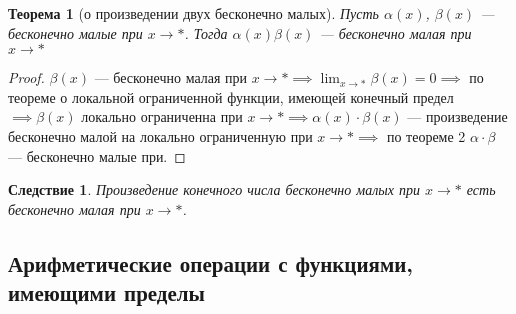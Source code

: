 \documentclass[a4paper,12pt]{article} %
\newtheorem{theorem}{Теорема}[subsection]
\newtheorem{corollary}{Следствие}[theorem]
\theoremstyle{remark}
\begin{document}
\begin{theorem}[о произведении двух бесконечно малых]
	Пусть $\alpha(x)$, $\beta(x)$ --- бесконечно малые при $x \to *$. Тогда $\alpha(x)\beta(x)$ --- бесконечно малая при $x \to *$
\end{theorem}
\begin{proof}
	$\beta(x)$ --- бесконечно малая при $x \to  * \implies \lim_{x \to *} \beta(x) = 0 \implies $ по теореме о локальной ограниченной функции, имеющей конечный предел $\implies \beta(x)$ локально ограниченна при $x\to * \implies \alpha(x)\cdot \beta(x)$ --- произведение бесконечно малой на локально ограниченную при $x\to * \implies$ по теореме 2 $\alpha\cdot \beta$ --- бесконечно малые при.
\end{proof}

\begin{corollary}
	Произведение конечного числа бесконечно малых при $x \to  *$ есть бесконечно малая при $x \to *$.
\end{corollary}

\subsection{Арифметические операции с функциями, имеющими пределы}
\end{document}
